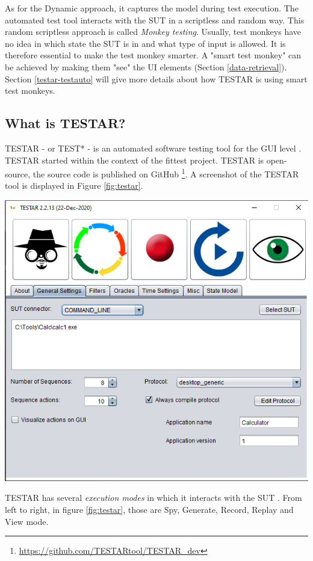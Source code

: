 As for the Dynamic approach, it captures the model during test execution. The automated test tool interacts with the SUT in a scriptless and random way. This random scriptless approach is called \emph{Monkey testing}. Usually, test monkeys have no idea in which state the SUT is in and what type of input is allowed. It is therefore essential to make the test monkey smarter. A "smart test monkey" can be achieved by making them "see" the UI elements (Section \ref{data-retrieval}). Section \ref{testar-testauto} will give more details about how TESTAR is using smart test monkeys.

\subsection{What is TESTAR?} \label{what-is-testar}
TESTAR - or TEST* - is an automated software testing tool for the GUI level \cite{testar-about}. TESTAR started within the context of the \acrfull{fittest} project. TESTAR is open-source, the source code is published on GitHub \footnote{ \url{https://github.com/TESTARtool/TESTAR\_dev}}. A screenshot of the TESTAR tool is displayed in Figure \ref{fig:testar}.

\bigskip
\begingroup
\captionsetup{type=figure}
\includegraphics[scale=0.5]{pics/testar.png}
\label{fig:testar}
\endgroup

TESTAR has several \emph{execution modes} in which it interacts with the SUT \cite{testar-manual}. From left to right, in figure \ref{fig:testar}, those are Spy, Generate, Record, Replay and View mode.


